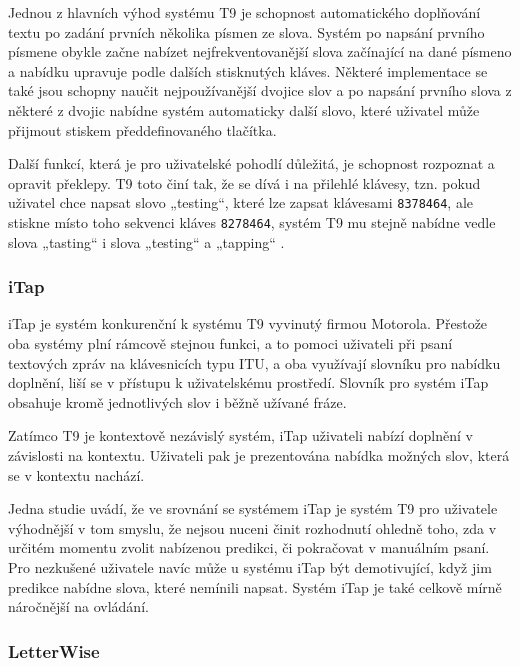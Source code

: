 \documentclass[a4paper,11pt]{article}
\begin{document}
Jednou z hlavních výhod systému T9 je schopnost automatického doplňování textu po zadání prvních několika písmen ze slova. Systém po napsání prvního písmene obykle začne nabízet nejfrekventovanější slova začínající na dané písmeno a nabídku upravuje podle dalších stisknutých kláves. Některé implementace se také jsou schopny naučit nejpoužívanější dvojice slov a po napsání prvního slova z některé z dvojic nabídne systém automaticky další slovo, které uživatel může přijmout stiskem předdefinovaného tlačítka. \cite{hrzQ70bvKjUBgVml} 

Další funkcí, která je pro uživatelské pohodlí důležitá, je schopnost rozpoznat a opravit překlepy. T9 toto činí tak, že se dívá i na přilehlé klávesy, tzn. pokud uživatel chce napsat slovo „testing“, které lze zapsat klávesami {\tt 8378464}, ale stiskne místo toho sekvenci kláves {\tt 8278464}, systém T9 mu stejně nabídne vedle slova „tasting“ i slova „testing“ a „tapping“ \cite{hrzQ70bvKjUBgVml}.

\subsubsection{iTap}

iTap je systém konkurenční k systému T9 vyvinutý firmou Motorola. Přestože oba systémy plní rámcově stejnou funkci, a to pomoci uživateli při psaní textových zpráv na klávesnicích typu ITU, a oba využívají slovníku pro nabídku doplnění, liší se v přístupu k uživatelskému prostředí. Slovník pro systém iTap obsahuje kromě jednotlivých slov i běžně užívané fráze.

Zatímco T9 je kontextově nezávislý systém, iTap uživateli nabízí doplnění v závislosti na kontextu. Uživateli pak je prezentována nabídka možných slov, která se v kontextu nachází. 

Jedna studie \cite{lBNMeL7t9XcnqSzq} uvádí, že ve srovnání se systémem iTap je systém T9 pro uživatele výhodnější v tom smyslu, že nejsou nuceni činit rozhodnutí ohledně toho, zda v určitém momentu zvolit nabízenou predikci, či pokračovat v manuálním psaní. Pro nezkušené uživatele navíc může u systému iTap být demotivující, když jim predikce nabídne slova, které nemínili napsat. Systém iTap je také celkově mírně náročnější na ovládání.

\subsubsection{LetterWise}
\end{document}
